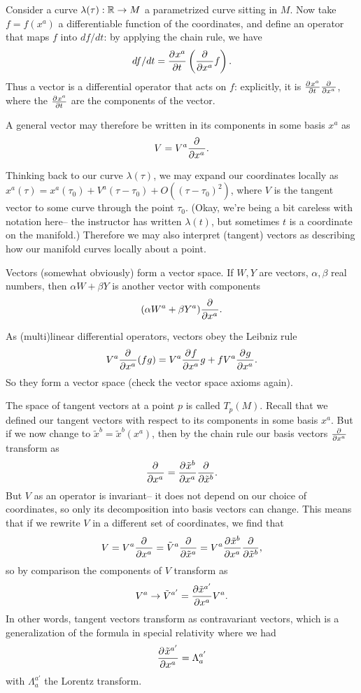Consider a curve $\lambda(\tau):\RR\to M$ a parametrized curve sitting in $M$. Now take $f=f(x^a)$ a differentiable function of the coordinates, and define an operator that maps $f$ into $df/dt$: by applying the chain rule, we have
$$df/dt=\P{x^a}{t}\left(\P{}{x^a}f\right).$$
Thus a vector is a differential operator that acts on $f$: explicitly, it is $\P{x^a}{t}\P{}{x^a}$, where the $\P{x^a}{t}$ are the components of the vector.

A general vector may therefore be written in its components in some basis $x^a$ as
$$V= V^a \P{}{x^a}.$$

Thinking back to our curve $\lambda(\tau)$, we may expand our coordinates locally as $x^a(\tau)=x^a (\tau_0)+V^a (\tau-\tau_0)+O((\tau-\tau_0)^2)$, where $V$ is the tangent vector to some curve through the point $\tau_0$. (Okay, we're being a bit careless with notation here-- the instructor has written $\lambda(t)$, but sometimes $t$ is a coordinate on the manifold.) Therefore we may also interpret (tangent) vectors as describing how our manifold curves locally about a point.

Vectors (somewhat obviously) form a vector space. If $W, Y$ are vectors, $\alpha,\beta$ real numbers, then $\alpha W + \beta Y$ is another vector with components
$$(\alpha W^a+\beta Y^a)\P{}{x^a}.$$

As (multi)linear differential operators, vectors obey the Leibniz rule
$$V^a \P{}{x^a}(fg)= V^a \P{f}{x^a} g+ f V^a \P{g}{x^a}.$$
So they form a vector space (check the vector space axioms again).

The space of tangent vectors at a point $p$ is called $T_p(M)$. Recall that we defined our tangent vectors with respect to its components in some basis $x^a$. But if we now change to $\tilde x^b = \tilde x^b(x^a)$, then by the chain rule our basis vectors $\P{}{x^a}$ transform as
$$\P{}{x^a}=\P{\tilde x^{b}}{x^a}\frac{\partial}{\partial \tilde x^b}.$$
But $V$ as an operator is invariant-- it does not depend on our choice of coordinates, so only its decomposition into basis vectors can change. This means that if we rewrite $V$ in a different set of coordinates, we find that
$$V=V^a \P{}{x^a}=\tilde V^a \frac{\p}{\p\tilde x^a} = V^a \P{\tilde x^b}{x^a}\frac{\p}{\p\tilde x^b},$$
so by comparison the components of $V$ transform as
$$V^a\to \tilde V^{a'} = \frac{\p\tilde x^{a'}}{\p x^a} V^a.$$
In other words, tangent vectors transform as contravariant vectors, which is a generalization of the formula in special relativity where we had $$\P{\tilde x^{a'}}{x^a}=\Lambda^{a'}_{a}$$
with $\Lambda^{a'}_{a}$ the Lorentz transform.

